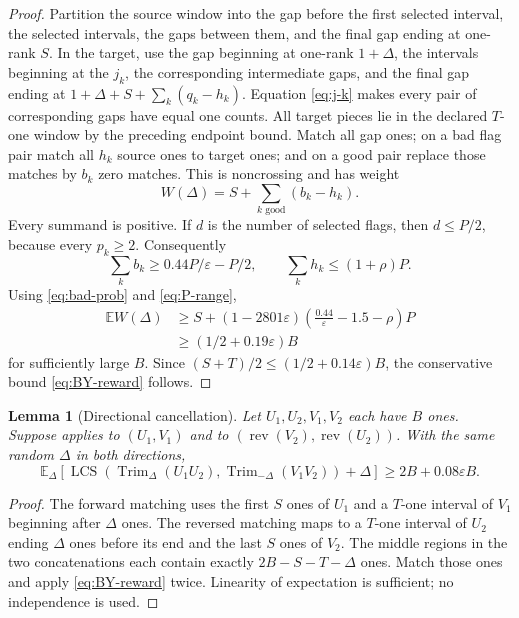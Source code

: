 \documentclass[11pt]{article}
\newtheorem{lemma}[lemma]{Lemma}
\theoremstyle{remark}
\newcommand{\LCS}{\operatorname{LCS}}
\newcommand{\rev}{\operatorname{rev}}
\newcommand{\Trim}{\operatorname{Trim}}
\newcommand{\eps}{\varepsilon}
\begin{document}
\begin{proof}
Partition the source window into the gap before the first selected interval,
the selected intervals, the gaps between them, and the final gap ending at
one-rank $S$.  In the target, use the gap beginning at one-rank $1+\Delta$,
the intervals beginning at the $j_k$, the corresponding intermediate gaps,
and the final gap ending at
$1+\Delta+S+\sum_k(q_k-h_k)$.  Equation \eqref{eq:j-k} makes every pair of
corresponding gaps have equal one counts.  All target pieces lie in the
declared $T$-one window by the preceding endpoint bound.  Match all gap ones;
on a bad flag pair match all $h_k$
source ones to target ones; and on a good pair replace those matches by
$b_k$ zero matches.  This is noncrossing and has weight
\begin{equation}\label{eq:W}
 W(\Delta)=S+\sum_{k\text{ good}}(b_k-h_k).
\end{equation}
Every summand is positive.  If $d$ is the number of selected flags, then
$d\le P/2$, because every $p_k\ge2$.  Consequently
\[
 \sum_kb_k\ge0.44P/\eps-P/2,
 \qquad
 \sum_kh_k\le(1+\rho)P.
\]
Using \eqref{eq:bad-prob} and \eqref{eq:P-range},
\begin{align*}
 \mathbb EW(\Delta)
 &\ge S+(1-2801\eps)
       \left(\frac{0.44}{\eps}-1.5-\rho\right)P\\
 &\ge(1/2+0.19\eps)B
\end{align*}
for sufficiently large $B$.  Since
$(S+T)/2\le(1/2+0.14\eps)B$, the conservative bound
\eqref{eq:BY-reward} follows.
\end{proof}

\begin{lemma}[Directional cancellation]\label{lem:BY-pair}
Let $U_1,U_2,V_1,V_2$ each have $B$ ones.  Suppose
 applies to $(U_1,V_1)$ and to
$(\rev(V_2),\rev(U_2))$.  With the same random $\Delta$ in both directions,
\[
 \mathbb E_\Delta\left[
 \LCS(\Trim_\Delta(U_1U_2),\Trim_{-\Delta}(V_1V_2))+\Delta
 \right]
 \ge2B+0.08\eps B.
\]
\end{lemma}

\begin{proof}
The forward matching uses the first $S$ ones of $U_1$ and a $T$-one interval
of $V_1$ beginning after $\Delta$ ones.  The reversed matching maps to a
$T$-one interval of $U_2$ ending $\Delta$ ones before its end and the last
$S$ ones of $V_2$.  The middle regions in the two concatenations each contain
exactly $2B-S-T-\Delta$ ones.  Match those ones and apply
\eqref{eq:BY-reward} twice.  Linearity of expectation is sufficient; no
independence is used.
\end{proof}
\end{document}
